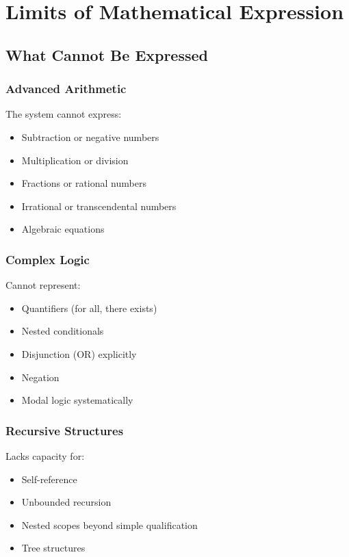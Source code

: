 \section{Limits of Mathematical Expression}

\subsection{What Cannot Be Expressed}

\subsubsection{Advanced Arithmetic}
The system cannot express:
\begin{itemize}
    \item Subtraction or negative numbers
    \item Multiplication or division
    \item Fractions or rational numbers
    \item Irrational or transcendental numbers
    \item Algebraic equations
\end{itemize}

\subsubsection{Complex Logic}
Cannot represent:
\begin{itemize}
    \item Quantifiers (for all, there exists)
    \item Nested conditionals
    \item Disjunction (OR) explicitly
    \item Negation
    \item Modal logic systematically
\end{itemize}

\subsubsection{Recursive Structures}
Lacks capacity for:
\begin{itemize}
    \item Self-reference
    \item Unbounded recursion
    \item Nested scopes beyond simple qualification
    \item Tree structures
\end{itemize}

